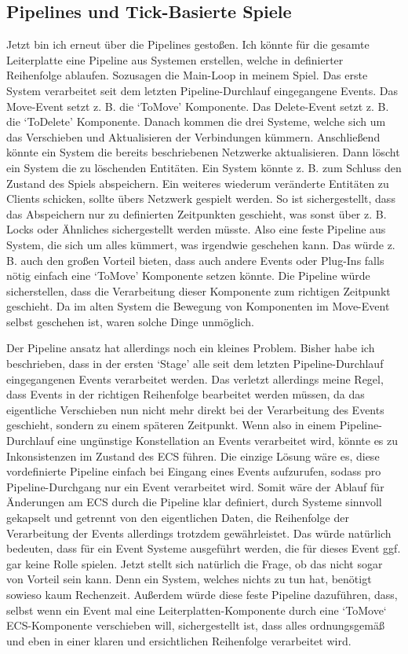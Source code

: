 \documentclass{article}
\begin{document}
    \subsection{Pipelines und Tick-Basierte Spiele}
    Jetzt bin ich erneut über die Pipelines gestoßen.
    Ich könnte für die gesamte Leiterplatte eine Pipeline aus Systemen erstellen, welche in definierter Reihenfolge ablaufen.
    Sozusagen die Main-Loop in meinem Spiel.
    Das erste System verarbeitet seit dem letzten Pipeline-Durchlauf eingegangene Events.
    Das Move-Event setzt z. B. die `ToMove' Komponente.
    Das Delete-Event setzt z. B. die `ToDelete' Komponente.
    Danach kommen die drei Systeme, welche sich um das Verschieben und Aktualisieren der Verbindungen kümmern.
    Anschließend könnte ein System die bereits beschriebenen Netzwerke aktualisieren.
    Dann löscht ein System die zu löschenden Entitäten.
    Ein System könnte z. B. zum Schluss den Zustand des Spiels abspeichern.
    Ein weiteres wiederum veränderte Entitäten zu Clients schicken, sollte übers Netzwerk gespielt werden.
    So ist sichergestellt, dass das Abspeichern nur zu definierten Zeitpunkten geschieht, was sonst über z. B. Locks
    oder Ähnliches sichergestellt werden müsste.
    Also eine feste Pipeline aus System, die sich um alles kümmert, was irgendwie geschehen kann.
    Das würde z. B. auch den großen Vorteil bieten, dass auch andere Events oder Plug-Ins falls nötig einfach eine
    `ToMove' Komponente setzen könnte.
    Die Pipeline würde sicherstellen, dass die Verarbeitung dieser Komponente zum richtigen Zeitpunkt geschieht.
    Da im alten System die Bewegung von Komponenten im Move-Event selbst geschehen ist,  waren solche Dinge unmöglich.

    Der Pipeline ansatz hat allerdings noch ein kleines Problem.
    Bisher habe ich beschrieben, dass in der ersten `Stage' alle seit dem letzten Pipeline-Durchlauf eingegangenen Events verarbeitet werden.
    Das verletzt allerdings meine Regel, dass Events in der richtigen Reihenfolge bearbeitet werden müssen, da das eigentliche Verschieben
    nun nicht mehr direkt bei der Verarbeitung des Events geschieht, sondern zu einem späteren Zeitpunkt.
    Wenn also in einem Pipeline-Durchlauf eine ungünstige Konstellation an Events verarbeitet wird, könnte es zu Inkonsistenzen im Zustand
    des ECS führen.
    Die einzige Lösung wäre es, diese vordefinierte Pipeline einfach bei Eingang eines Events aufzurufen, sodass pro Pipeline-Durchgang
    nur ein Event verarbeitet wird.
    Somit wäre der Ablauf für Änderungen am ECS durch die Pipeline klar definiert, durch Systeme sinnvoll
    gekapselt und getrennt von den eigentlichen Daten, die Reihenfolge der Verarbeitung der Events allerdings trotzdem gewährleistet.
    Das würde natürlich bedeuten, dass für ein Event Systeme ausgeführt werden, die für dieses Event ggf. gar keine Rolle spielen.
    Jetzt stellt sich natürlich die Frage, ob das nicht sogar von Vorteil sein kann.
    Denn ein System, welches nichts zu tun hat, benötigt sowieso kaum Rechenzeit.
    Außerdem würde diese feste Pipeline dazuführen, dass, selbst wenn ein Event mal eine Leiterplatten-Komponente durch
    eine `ToMove` ECS-Komponente verschieben will, sichergestellt ist, dass alles ordnungsgemäß und eben in einer klaren
    und ersichtlichen Reihenfolge verarbeitet wird.
\end{document}
